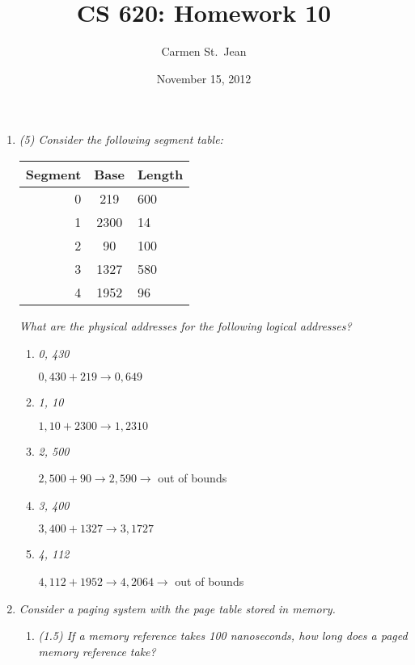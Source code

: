 \documentclass[letterpaper,11pt]{article}
\begin{document}
\title{CS 620: Homework 10}
\date{November 15, 2012}
\author{Carmen St.\ Jean}

\maketitle

\begin{enumerate}
\item \emph{(5) Consider the following segment table:}

\begin{center}
  \begin{tabular}{r | c | l}
    Segment & Base & Length \\ \hline
    \hline
    0 & 219 & 600 \\ \hline
    1 & 2300 & 14 \\ \hline
    2 & 90 & 100 \\ \hline
    3 & 1327 & 580 \\ \hline
    4 & 1952 & 96 \\ \hline
  \end{tabular}
\end{center}
\emph{What are the physical addresses for the following logical addresses?}

  \begin{enumerate}
    \item \emph{0, 430}

    $0, 430 + 219 \rightarrow 0, 649$
    \item \emph{1, 10}

    $1, 10 + 2300 \rightarrow 1, 2310$
    \item \emph{2, 500}

    $2, 500 + 90 \rightarrow 2, 590 \rightarrow$ out of bounds
    \item \emph{3, 400}

    $3, 400 + 1327 \rightarrow 3, 1727$
    \item \emph{4, 112}

    $4, 112 + 1952 \rightarrow 4, 2064\rightarrow$ out of bounds
  \end{enumerate}

\item  \emph{Consider a paging system with the page table stored in memory.}
  \begin{enumerate}
    \item \emph{(1.5) If a memory reference takes 100 nanoseconds, how long does a paged memory reference take?}


\end{enumerate}
\end{enumerate}
\end{document}
